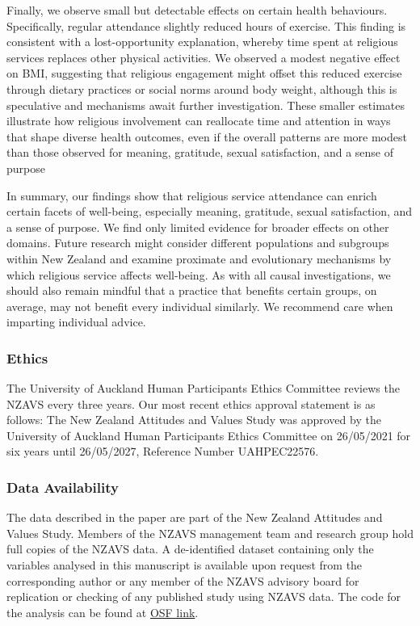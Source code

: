 \documentclass[
  single column]{article}
\begin{document}
Finally, we observe small but detectable effects on certain health
behaviours. Specifically, regular attendance slightly reduced hours of
exercise. This finding is consistent with a lost-opportunity
explanation, whereby time spent at religious services replaces other
physical activities. We observed a modest negative effect on BMI,
suggesting that religious engagement might offset this reduced exercise
through dietary practices or social norms around body weight, although
this is speculative and mechanisms await further investigation. These
smaller estimates illustrate how religious involvement can reallocate
time and attention in ways that shape diverse health outcomes, even if
the overall patterns are more modest than those observed for meaning,
gratitude, sexual satisfaction, and a sense of purpose

In summary, our findings show that religious service attendance can
enrich certain facets of well-being, especially meaning, gratitude,
sexual satisfaction, and a sense of purpose. We find only limited
evidence for broader effects on other domains. Future research might
consider different populations and subgroups within New Zealand and
examine proximate and evolutionary mechanisms by which religious service
affects well-being. As with all causal investigations, we should also
remain mindful that a practice that benefits certain groups, on average,
may not benefit every individual similarly. We recommend care when
imparting individual advice.

\subsubsection{Ethics}\label{ethics}

The University of Auckland Human Participants Ethics Committee reviews
the NZAVS every three years. Our most recent ethics approval statement
is as follows: The New Zealand Attitudes and Values Study was approved
by the University of Auckland Human Participants Ethics Committee on
26/05/2021 for six years until 26/05/2027, Reference Number UAHPEC22576.

\subsubsection{Data Availability}\label{data-availability}

The data described in the paper are part of the New Zealand Attitudes
and Values Study. Members of the NZAVS management team and research
group hold full copies of the NZAVS data. A de-identified dataset
containing only the variables analysed in this manuscript is available
upon request from the corresponding author or any member of the NZAVS
advisory board for replication or checking of any published study using
NZAVS data. The code for the analysis can be found at
\href{https://osf.io/ab7cx/}{OSF link}.
\end{document}
